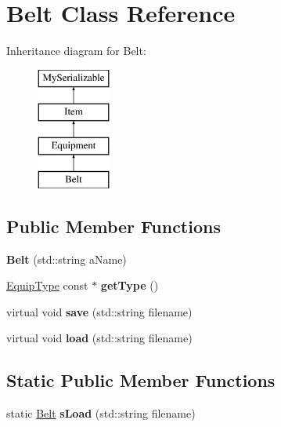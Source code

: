 \hypertarget{class_belt}{}\section{Belt Class Reference}
\label{class_belt}
Inheritance diagram for Belt\+:\begin{figure}[H]
\begin{center}
\leavevmode
\includegraphics[height=4.000000cm]{class_belt}
\end{center}
\end{figure}
\subsection*{Public Member Functions}
\begin{DoxyCompactItemize}
\item 
\hypertarget{class_belt_a470356c642e72b0f5b802b4fe493db1f}{}\label{class_belt_a470356c642e72b0f5b802b4fe493db1f} 
{\bfseries Belt} (std\+::string a\+Name)
\item 
\hypertarget{class_belt_a03df5b10913866f59261c852326a3e12}{}\label{class_belt_a03df5b10913866f59261c852326a3e12} 
\hyperlink{class_equip_type}{Equip\+Type} const  $\ast$ {\bfseries get\+Type} ()
\item 
\hypertarget{class_belt_a76196f73ef9cd8ddad51461e70635a56}{}\label{class_belt_a76196f73ef9cd8ddad51461e70635a56} 
virtual void {\bfseries save} (std\+::string filename)
\item 
\hypertarget{class_belt_a3e2002db2733fa08c779e12bdc66bd5b}{}\label{class_belt_a3e2002db2733fa08c779e12bdc66bd5b} 
virtual void {\bfseries load} (std\+::string filename)
\end{DoxyCompactItemize}
\subsection*{Static Public Member Functions}
\begin{DoxyCompactItemize}
\item 
\hypertarget{class_belt_a5f1ce1a149d073e7688a6c0d594bf9e8}{}\label{class_belt_a5f1ce1a149d073e7688a6c0d594bf9e8} 
static \hyperlink{class_belt}{Belt} {\bfseries s\+Load} (std\+::string filename)
\end{DoxyCompactItemize}
